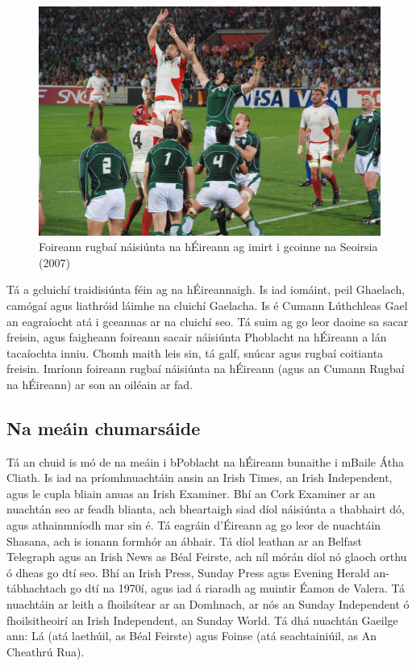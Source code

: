 \documentclass[a4paper,12pt]{article}
\theoremstyle{plain} %
\theoremstyle{definition} %
\theoremstyle{remark} %
\begin{document}
\begin{figure}
\includegraphics[width=\linewidth]{Ireland_vs_Georgia.jpg}
\caption{Foireann rugbaí náisiúnta na hÉireann ag imirt i gcoinne na Seoirsia (2007)}
\end{figure}Tá a gcluichí traidisiúnta féin ag na hÉireannaigh. Is iad iomáint, peil Ghaelach, camógaí agus liathróid láimhe na cluichí Gaelacha. Is é Cumann Lúthchleas Gael an eagraíocht atá i gceannas ar na cluichí seo. Tá suim ag go leor daoine sa sacar freisin, agus faigheann foireann sacair náisiúnta Phoblacht na hÉireann a lán tacaíochta inniu. Chomh maith leis sin, tá galf, snúcar agus rugbaí coitianta freisin. Imríonn foireann rugbaí náisiúnta na hÉireann (agus an Cumann Rugbaí na hÉireann) ar son an oiléain ar fad.

\subsection{Na meáin chumarsáide}

Tá an chuid is mó de na meáin i bPoblacht na hÉireann bunaithe i mBaile Átha Cliath. Is iad na príomhnuachtáin ansin an Irish Times, an Irish Independent, agus le cupla bliain anuas an Irish Examiner. Bhí an Cork Examiner ar an nuachtán seo ar feadh blianta, ach bheartaigh siad díol náisiúnta a thabhairt dó, agus athainmníodh mar sin é. Tá eagráin d'Éireann ag go leor de nuachtáin Shasana, ach is ionann formhór an ábhair. Tá díol leathan ar an Belfast Telegraph agus an Irish News as Béal Feirste, ach níl mórán díol nó glaoch orthu ó dheas go dtí seo. Bhí an Irish Press, Sunday Press agus Evening Herald an-tábhachtach go dtí na 1970í, agus iad á riaradh ag muintir Éamon de Valera. Tá nuachtáin ar leith a fhoilsítear ar an Domhnach, ar nós an Sunday Independent ó fhoilsitheoirí an Irish Independent, an Sunday World. Tá dhá nuachtán Gaeilge ann: Lá (atá laethúil, as Béal Feirste) agus Foinse (atá seachtainiúil, as An Cheathrú Rua).
\end{document}
